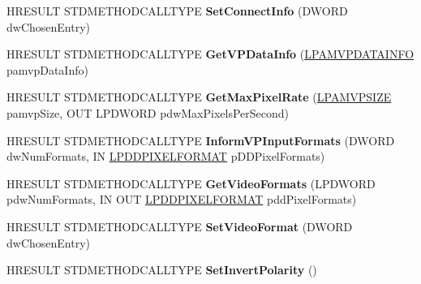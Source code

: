 \begin{DoxyCompactItemize}
\item 
\mbox{\label{class_c_v_p_config_a437e1df752940ee8e2864ec733bd81d2}} 
H\+R\+E\+S\+U\+LT S\+T\+D\+M\+E\+T\+H\+O\+D\+C\+A\+L\+L\+T\+Y\+PE {\bfseries Set\+Connect\+Info} (D\+W\+O\+RD dw\+Chosen\+Entry)
\item 
\mbox{\label{class_c_v_p_config_aed89630c706a45a17a31997b9b506996}} 
H\+R\+E\+S\+U\+LT S\+T\+D\+M\+E\+T\+H\+O\+D\+C\+A\+L\+L\+T\+Y\+PE {\bfseries Get\+V\+P\+Data\+Info} (\hyperlink{struct___a_m_v_p_d_a_t_a_i_n_f_o}{L\+P\+A\+M\+V\+P\+D\+A\+T\+A\+I\+N\+FO} pamvp\+Data\+Info)
\item 
\mbox{\label{class_c_v_p_config_ad572d7ca2c1b74d2eaae1052f23ccf58}} 
H\+R\+E\+S\+U\+LT S\+T\+D\+M\+E\+T\+H\+O\+D\+C\+A\+L\+L\+T\+Y\+PE {\bfseries Get\+Max\+Pixel\+Rate} (\hyperlink{struct___a_m_v_p_s_i_z_e}{L\+P\+A\+M\+V\+P\+S\+I\+ZE} pamvp\+Size, O\+UT L\+P\+D\+W\+O\+RD pdw\+Max\+Pixels\+Per\+Second)
\item 
\mbox{\label{class_c_v_p_config_a0f5a1d1396407c5d6c58cdea125d7658}} 
H\+R\+E\+S\+U\+LT S\+T\+D\+M\+E\+T\+H\+O\+D\+C\+A\+L\+L\+T\+Y\+PE {\bfseries Inform\+V\+P\+Input\+Formats} (D\+W\+O\+RD dw\+Num\+Formats, IN \hyperlink{interfacevoid}{L\+P\+D\+D\+P\+I\+X\+E\+L\+F\+O\+R\+M\+AT} p\+D\+D\+Pixel\+Formats)
\item 
\mbox{\label{class_c_v_p_config_aa8ef3bef41ff6a6f58eb93294d99021b}} 
H\+R\+E\+S\+U\+LT S\+T\+D\+M\+E\+T\+H\+O\+D\+C\+A\+L\+L\+T\+Y\+PE {\bfseries Get\+Video\+Formats} (L\+P\+D\+W\+O\+RD pdw\+Num\+Formats, IN O\+UT \hyperlink{interfacevoid}{L\+P\+D\+D\+P\+I\+X\+E\+L\+F\+O\+R\+M\+AT} pdd\+Pixel\+Formats)
\item 
\mbox{\label{class_c_v_p_config_a2f64f477d7a55aa52cdd32ce54d59cb5}} 
H\+R\+E\+S\+U\+LT S\+T\+D\+M\+E\+T\+H\+O\+D\+C\+A\+L\+L\+T\+Y\+PE {\bfseries Set\+Video\+Format} (D\+W\+O\+RD dw\+Chosen\+Entry)
\item 
\mbox{\label{class_c_v_p_config_a3245d49393ffb832aa250d5e03e27b69}} 
H\+R\+E\+S\+U\+LT S\+T\+D\+M\+E\+T\+H\+O\+D\+C\+A\+L\+L\+T\+Y\+PE {\bfseries Set\+Invert\+Polarity} ()
\item 
\mbox{\label{class_c_v_p_config_acf354e9cebd0e6a554c1be91c7e12329}} 

\end{DoxyCompactItemize}
